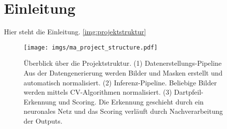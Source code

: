 
\chapter{Einleitung}
\label{cha:einleitung}

Hier steht die Einleitung. \autoref{img:projektstruktur}

\begin{figure}
    \centering
    \texttt{[image: imgs/ma\_project\_structure.pdf]}
    \caption{Überblick über die Projektstruktur. (1) Datenerstellungs-Pipeline Aus der Datengenerierung werden Bilder und Masken erstellt und automatisch normalisiert. (2) Inferenz-Pipeline. Beliebige Bilder werden mittels CV-Algorithmen normalisiert. (3) Dartpfeil-Erkennung und Scoring. Die Erkennung geschieht durch ein neuronales Netz und das Scoring verläuft durch Nachverarbeitung der Outputs.}
    \label{img:projektstruktur}
\end{figure}

